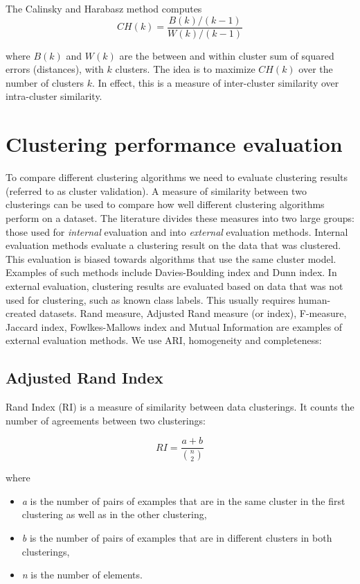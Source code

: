 \documentclass[conference]{IEEEtran}
\begin{document}
The Calinsky and Harabasz method computes
\begin{equation}
\label{calinsky}
CH(k) = \frac{B(k)/(k-1)}{W(k)/(k-1)}
\end{equation}

where $B(k)$ and $W(k)$ are the between and within cluster sum of squared errors (distances),
with $k$ clusters. The idea is to maximize $CH(k)$ over the number of clusters $k$. In effect, this
is a measure of inter-cluster similarity over intra-cluster similarity.

\section{Clustering performance evaluation}
To compare different clustering algorithms we need to evaluate clustering results (referred to as cluster validation).
A measure of similarity between two clusterings can be used to compare how well different clustering algorithms perform
on a dataset. The literature divides these measures into two large groups: those used for \textit{internal} evaluation
and into \textit{external} evaluation methods. Internal evaluation methods evaluate a clustering result on the data
that was clustered. This evaluation is biased towards algorithms that use the same cluster model. Examples of such methods
include Davies-Boulding index and Dunn index. In external evaluation, clustering results are evaluated based on data
that was not used for clustering, such as known class labels. This usually requires human-created datasets. Rand measure,
Adjusted Rand measure (or index), F-measure, Jaccard index, Fowlkes-Mallows index and Mutual Information are examples
of external evaluation methods. We use ARI, homogeneity and completeness:

\subsection{Adjusted Rand Index}
Rand Index (RI) is a measure of similarity between data clusterings. It counts
the number of agreements between two clusterings:

\begin{equation}
\label{RI}
RI = \frac{a+b}{{n \choose 2}}
\end{equation}

where
\begin{itemize}
    \item \textit{a} is the number of pairs of examples that are in the same cluster in the first clustering
    as well as in the other clustering,
    \item \textit{b} is the number of pairs of examples that are in different clusters in both clusterings,
    \item \textit{n} is the number of elements.
\end{itemize}
\end{document}
